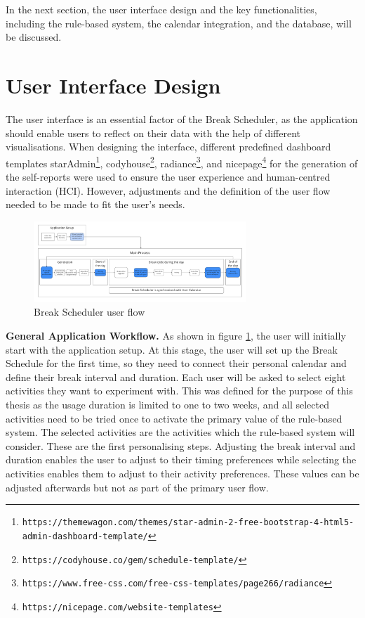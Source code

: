 \documentclass{hasel_thesis}
\begin{document}
In the next section, the user interface design and the key functionalities, including the rule-based system, the calendar integration, and the database, will be discussed.

\section{User Interface Design} \label{interface}

The user interface is an essential factor of the Break Scheduler, as the application should enable users to reflect on their data with the help of different visualisations. When designing the interface, different predefined dashboard templates starAdmin\footnote{\texttt{https://themewagon.com/themes/star-admin-2-free-bootstrap-4-html5-admin-dashboard-template/}}, codyhouse\footnote{\texttt{https://codyhouse.co/gem/schedule-template/}}, radiance\footnote{\texttt{https://www.free-css.com/free-css-templates/page266/radiance}}, and nicepage\footnote{\texttt{https://nicepage.com/website-templates}} for the generation of the self-reports were used to ensure the user experience and human-centred interaction (HCI). However, adjustments and the definition of the user flow needed to be made to fit the user's needs.

\begin{figure}[htp]
    \centering
    \includegraphics[angle=90 , width=8cm]{hasel_thesis/images/userflow_v3.png}
    \caption{Break Scheduler user flow}
    \label{fig:user-flow}
\end{figure}


\textbf{General Application Workflow.} As shown in figure \ref{fig:user-flow}, the user will initially start with the application setup. At this stage, the user will set up the Break Schedule for the first time, so they need to connect their personal calendar and define their break interval and duration. Each user will be asked to select eight activities they want to experiment with. This was defined for the purpose of this thesis as the usage duration is limited to one to two weeks, and all selected activities need to be tried once to activate the primary value of the rule-based system. The selected activities are the activities which the rule-based system will consider. These are the first personalising steps. Adjusting the break interval and duration enables the user to adjust to their timing preferences while selecting the activities enables them to adjust to their activity preferences. These values can be adjusted afterwards but not as part of the primary user flow. 
\end{document}
